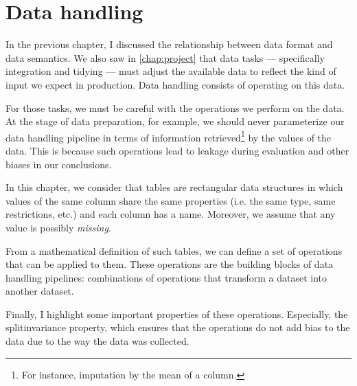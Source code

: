 \chapter{Data handling}
\label{chap:handling}
\glsresetall


In the previous chapter, I discussed the relationship between data format and data
semantics.  We also saw in \cref{chap:project} that data tasks --- specifically
integration and tidying --- must adjust the available data to reflect the kind of
input we expect in production.  Data handling consists of operating on this data.

For those tasks, we must be careful with the operations we perform on the data. At the
stage of data preparation, for example, we should never parameterize our data handling
pipeline in terms of information retrieved\footnote{For instance, imputation by the mean
of a column.} by the values of the data.  This is because such operations lead to \gls{leakage}
during evaluation and other biases in our conclusions.

In this chapter, we consider that tables are rectangular data structures in which values
of the same column share the same properties (i.e. the same type, same restrictions, etc.)
and each column has a name.  Moreover, we assume that any value is possibly
\emph{missing}.

From a mathematical definition of such tables, we can define a set of operations that can
be applied to them.  These operations are the building blocks of data handling pipelines:
combinations of operations that transform a dataset into another dataset.

Finally, I highlight some important properties of these operations.  Especially, the
\gls{splitinvariance} property, which ensures that the operations do not add bias to the data
due to the way the data was collected.


